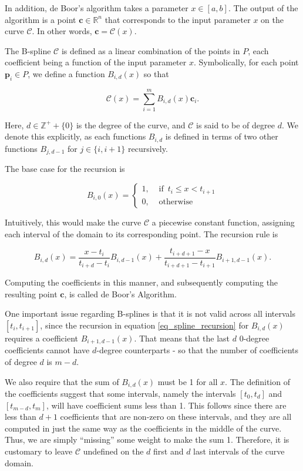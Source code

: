\documentclass[english]{article}
\begin{document}
In addition, de Boor's algorithm takes a parameter $x \in [a, b]$. The output of the algorithm is a point $\mathbf{c} \in \mathbb{R}^n$ that corresponds to the input parameter $x$ on the curve $\mathcal{C}$. In other words, $\mathbf{c} = \mathcal{C}(x)$.

The B-spline $\mathcal{C}$ is defined as a linear combination of the points in $P$, each coefficient being a function of the input parameter $x$. Symbolically, for each point $\mathbf{p}_i \in P$, we define a function $B_{i,d}(x)$ so that

\[
\mathcal{C}(x) = \sum_{i = 1}^mB_{i,d}(x)\mathbf{c}_i.
\]

Here, $d \in \mathbb{Z^+} + \{0\}$ is the degree of the curve, and $\mathcal{C}$ is said to be of degree $d$. We denote this explicitly, as each functions $B_{i,d}$ is defined in terms of two other functions $B_{j,d-1}$ for $j \in \{i, i + 1\}$ recursively.

The base case for the recursion is

\begin{equation}
B_{i,0}(x) = \begin{cases}
  1, &\text{ if } \, t_i \leq x < t_{i + 1} \\
  0, &\text{ otherwise }
\end{cases}
\end{equation}

Intuitively, this would make the curve $\mathcal{C}$ a piecewise constant function, assigning each interval of the domain to its corresponding point. The recursion rule is

\begin{equation} \label{eq_spline_recursion}
B_{i,d}(x) = \dfrac{x - t_i}{t_{i + d} - t_i}B_{i,d - 1}(x) + \dfrac{t_{i + d + 1} - x}{t_{i + d + 1} - t_{i + 1}}B_{i + 1,d - 1}(x).
\end{equation}

Computing the coefficients in this manner, and subsequently computing the resulting point $\mathbf{c}$, is called de Boor's Algorithm.

One important issue regarding B-splines is that it is not valid across all intervals $[t_i, t_{i + 1}]$, since the recursion in equation \ref{eq_spline_recursion} for $B_{i,d}(x)$ requires a coefficient $B_{i + 1, d - 1}(x)$. That means that the last $d$ 0-degree coefficients cannot have $d$-degree counterparts - so that the number of coefficients of degree $d$ is $m - d$.

We also require that the sum of $B_{i,d}(x)$ must be 1 for all $x$. The definition of the coefficients suggest that some intervals, namely the intervals $[t_0, t_d]$ and $[t_{m-d},t_{m}]$, will have coefficient sums less than 1. This follows since there are less than $d + 1$ coefficients that are non-zero on these intervals, and they are all computed in just the same way as the coefficients in the middle of the curve. Thus, we are simply ``missing'' some weight to make the sum 1. Therefore, it is customary to leave $\mathcal{C}$ undefined on the $d$ first and $d$ last intervals of the curve domain.
\end{document}
